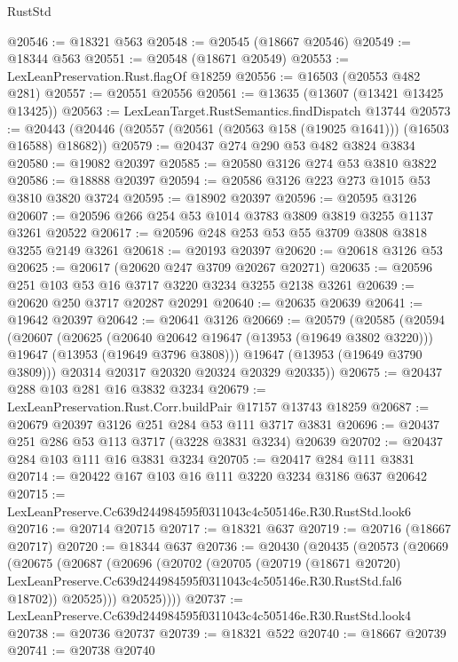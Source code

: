 \begin{lexlean}{RustStd}
\begin{coremodule}
@20546 := @18321 @563
@20548 := @20545 (@18667 @20546)
@20549 := @18344 @563
@20551 := @20548 (@18671 @20549)
@20553 := LexLeanPreservation.Rust.flagOf @18259
@20556 := @16503 (@20553 @482 @281)
@20557 := @20551 @20556
@20561 := @13635 (@13607 (@13421 @13425 @13425))
@20563 := LexLeanTarget.RustSemantics.findDispatch @13744
@20573 := @20443 (@20446 (@20557 (@20561 (@20563 @158 (@19025 @1641))) (@16503 @16588) @18682))
@20579 := @20437 @274 @290 @53 @482 @3824 @3834
@20580 := @19082 @20397
@20585 := @20580 @3126 @274 @53 @3810 @3822
@20586 := @18888 @20397
@20594 := @20586 @3126 @223 @273 @1015 @53 @3810 @3820 @3724
@20595 := @18902 @20397
@20596 := @20595 @3126
@20607 := @20596 @266 @254 @53 @1014 @3783 @3809 @3819 @3255 @1137 @3261 @20522
@20617 := @20596 @248 @253 @53 @55 @3709 @3808 @3818 @3255 @2149 @3261
@20618 := @20193 @20397
@20620 := @20618 @3126 @53
@20625 := @20617 (@20620 @247 @3709 @20267 @20271)
@20635 := @20596 @251 @103 @53 @16 @3717 @3220 @3234 @3255 @2138 @3261
@20639 := @20620 @250 @3717 @20287 @20291
@20640 := @20635 @20639
@20641 := @19642 @20397
@20642 := @20641 @3126
@20669 := @20579
    (@20585
      (@20594
        (@20607
          (@20625
            (@20640 @20642 @19647 (@13953 (@19649 @3802 @3220)))
            @19647
            (@13953 (@19649 @3796 @3808)))
          @19647
          (@13953 (@19649 @3790 @3809)))
        @20314
        @20317
        @20320
        @20324
        @20329
        @20335))
@20675 := @20437 @288 @103 @281 @16 @3832 @3234
@20679 := LexLeanPreservation.Rust.Corr.buildPair @17157 @13743 @18259
@20687 := @20679 @20397 @3126 @251 @284 @53 @111 @3717 @3831
@20696 := @20437 @251 @286 @53 @113 @3717 (@3228 @3831 @3234) @20639
@20702 := @20437 @284 @103 @111 @16 @3831 @3234
@20705 := @20417 @284 @111 @3831
@20714 := @20422 @167 @103 @16 @111 @3220 @3234 @3186 @637 @20642
@20715 := LexLeanPreserve.Cc639d244984595f0311043c4c505146e.R30.RustStd.look6
@20716 := @20714 @20715
@20717 := @18321 @637
@20719 := @20716 (@18667 @20717)
@20720 := @18344 @637
@20736 := @20430
    (@20435
      (@20573
        (@20669
          (@20675
            (@20687
              (@20696
                (@20702
                  (@20705
                    (@20719
                      (@18671 @20720)
                      LexLeanPreserve.Cc639d244984595f0311043c4c505146e.R30.RustStd.fal6
                      @18702))
                  @20525)))
            @20525))))
@20737 := LexLeanPreserve.Cc639d244984595f0311043c4c505146e.R30.RustStd.look4
@20738 := @20736 @20737
@20739 := @18321 @522
@20740 := @18667 @20739
@20741 := @20738 @20740

\end{coremodule}
\end{lexlean}
